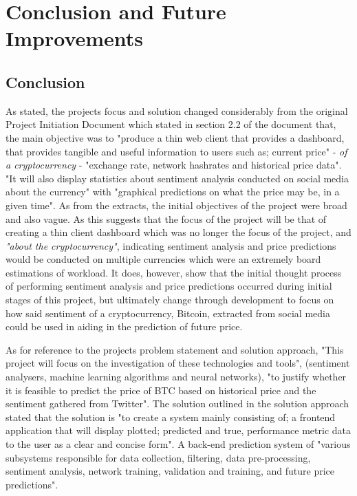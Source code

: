 \documentclass[oneside, 12pt]{article}
\begin{document}
	\newpage
	
	\section{Conclusion and Future Improvements}
		\subsection{Conclusion}
		As stated, the projects focus and solution changed considerably from the original Project Initiation Document which stated in section 2.2 of the document that, the main objective was to "produce a thin web client that provides a dashboard, that provides tangible and useful information to users such as; current price" - \textit{of a cryptocurrency} - "exchange rate, network hashrates and historical price data". "It will also display statistics about sentiment analysis conducted on social media about the currency" with "graphical predictions on what the price may be, in a given time". As from the extracts, the initial objectives of the project were broad and also vague. As this suggests that the focus of the project will be that of creating a thin client dashboard which was no longer the focus of the project, and \textit{"about the cryptocurrency"}, indicating sentiment analysis and price predictions would be conducted on multiple currencies which were an extremely board estimations of workload. It does, however, show that the initial thought process of performing sentiment analysis and price predictions occurred during initial stages of this project, but ultimately change through development to focus on how said sentiment of a cryptocurrency, Bitcoin, extracted from social media could be used in aiding in the prediction of future price.
		
		As for reference to the projects problem statement and solution approach, "This project will focus on the investigation of these technologies and tools", (sentiment analysers, machine learning algorithms and neural networks), "to justify whether it is feasible to predict the price of BTC based on historical price and the sentiment gathered from Twitter". The solution outlined in the solution approach stated that the solution is "to create a system mainly consisting of; a frontend application that will display plotted; predicted and true, performance metric data to the user as a clear and concise form". A back-end prediction system of "various subsystems responsible for data collection, filtering, data pre-processing, sentiment analysis, network training, validation and training, and future price predictions".
		
\end{document}

